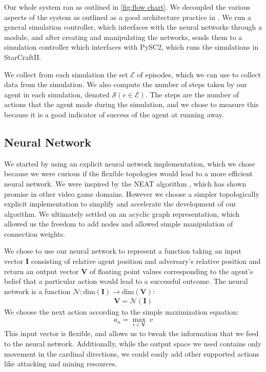\documentclass{article}
\begin{document}
Our whole system ran as outlined in \ref{fig:flow chart}. We decoupled the
various aspects of the system as outlined as a good architecture practice in
\cite{pragprog}. We run a general simulation controller, which interfaces with
the neural networks through a module, and after creating and manipulating the
networks, sends them to a simulation controller which interfaces with PySC2,
which runs the simulations in StarCraftII.

We collect from each simulation the set $\bm{\mathcal{E}}$ of episodes, which we
can use to collect data from the simulation. We also compute the number of steps
taken by our agent in each simulation, denoted
$\mathcal{S}(e\in\bm{\mathcal{E}})$. The steps are the number of actions that
the agent made during the simulation, and we chose to measure this because it is
a good indicator of success of the agent at running away.

\subsection{Neural Network}
We started by using an explicit neural network implementation, which we chose
because we were curious if the flexible topologies would lead to a more
efficient neural network. We were inspired by the NEAT algorithm \cite{NEAT}, which has
shown promise in other video game domains. However we choose a simpler
topologically explicit implementation to simplify and accelerate the development
of our
algorithm. We ultimately settled on an acyclic graph representation, which
allowed us the freedom to add nodes and allowed simple manipulation of
connection weights.

We chose to use our neural network to represent a function taking an input
vector $\bm{I}$ consisting of relative agent position and adversary's relative
position and return an output vector $\bm{V}$ of floating point values
corresponding to the agent's belief that a particular action would lead to a
successful outcome. The neural network is a function
$\mathcal{N}:\text{dim}(\bm{I})\rightarrow\text{dim}(\bm{V})$:
\begin{align}
  \bm{V} = \mathcal{N}(\bm{I})
\end{align}
We choose the next action according to the simple maximization equation:
\begin{align}
  a_n = \max_{v \in \bm{V}} \: v
\end{align}
This input vector is flexible, and allows us to tweak the information that we
feed to the neural network. Additionally, while the output space we used
contains only movement in the cardinal directions, we could easily add other
supported actions like attacking and mining resources.
\end{document}
